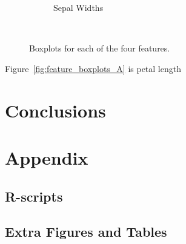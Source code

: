 \documentclass{article}
\begin{document}
\begin{figure}[H]
\begin{subfigure}{0.375\textwidth}
        \caption{Sepal Widths}
        \label{fig:feature_boxplots_D}
    \end{subfigure}\\
    \caption{Boxplots for each of the four features.}
    \label{fig:feature_boxplots}
\end{figure}

Figure~\ref{fig:feature_boxplots_A} is petal length



\section{Conclusions}

\section{Appendix}

\subsection{R-scripts}
\subsection{Extra Figures and Tables} 
\end{document}
